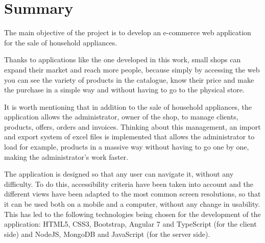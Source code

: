 \documentclass[a4paper, 12pt]{book}
\begin{document}

\chapter*{Summary}

The main objective of the project is to develop an e-commerce web application for the sale of household appliances.

Thanks to applications like the one developed in this work, small shops can expand their market and reach more people, because simply by accessing the web you can see the variety of products in the catalogue, know their price and make the purchase in a simple way and without having to go to the physical store. 

It is worth mentioning that in addition to the sale of household appliances, the application allows the administrator, owner of the shop, to manage clients, products, offers, orders and invoices. Thinking about this management, an import and export system of excel files is implemented that allows the administrator to load for example, products in a massive way without having to go one by one, making the administrator's work faster. 

The application is designed so that any user can navigate it, without any difficulty. To do this, accessibility criteria have been taken into account and the different views have been adapted to the most common screen resolutions, so that it can be used both on a mobile and a computer, without any change in usability. This has led to the following technologies being chosen for the development of the application: HTML5, CSS3, Bootstrap, Angular 7 and TypeScript (for the client side) and NodeJS, MongoDB and JavaScript (for the server side).




\tableofcontents 
\cleardoublepage
\listoffigures %
\end{document}
